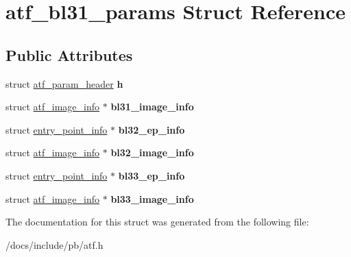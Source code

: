 \hypertarget{structatf__bl31__params}{}\section{atf\+\_\+bl31\+\_\+params Struct Reference}
\label{structatf__bl31__params}
\subsection*{Public Attributes}
\begin{DoxyCompactItemize}
\item 
\mbox{\label{structatf__bl31__params_aebe47862a7887884fa2a187489c75959}} 
struct \hyperlink{structatf__param__header}{atf\+\_\+param\+\_\+header} {\bfseries h}
\item 
\mbox{\label{structatf__bl31__params_af32028c21cb5077758fafd8ceec7a01e}} 
struct \hyperlink{structatf__image__info}{atf\+\_\+image\+\_\+info} $\ast$ {\bfseries bl31\+\_\+image\+\_\+info}
\item 
\mbox{\label{structatf__bl31__params_aba990f9207530d7e86231059bd5cdb60}} 
struct \hyperlink{structentry__point__info}{entry\+\_\+point\+\_\+info} $\ast$ {\bfseries bl32\+\_\+ep\+\_\+info}
\item 
\mbox{\label{structatf__bl31__params_a93272088e5ad2fc29704fc4ee789a052}} 
struct \hyperlink{structatf__image__info}{atf\+\_\+image\+\_\+info} $\ast$ {\bfseries bl32\+\_\+image\+\_\+info}
\item 
\mbox{\label{structatf__bl31__params_a0fa9e0d7ea485b35e6e37a36baa9c47d}} 
struct \hyperlink{structentry__point__info}{entry\+\_\+point\+\_\+info} $\ast$ {\bfseries bl33\+\_\+ep\+\_\+info}
\item 
\mbox{\label{structatf__bl31__params_a9c9f1ba464fb9d6dededd756ed86fef7}} 
struct \hyperlink{structatf__image__info}{atf\+\_\+image\+\_\+info} $\ast$ {\bfseries bl33\+\_\+image\+\_\+info}
\end{DoxyCompactItemize}


The documentation for this struct was generated from the following file\+:\begin{DoxyCompactItemize}
\item 
/docs/include/pb/atf.\+h\end{DoxyCompactItemize}
